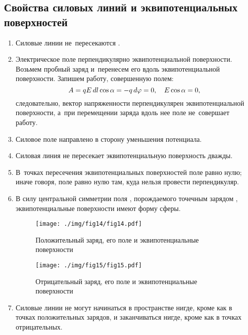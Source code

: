 	\subsection{Свойства силовых линий и эквипотенциальных поверхностей}
		\begin{enumerate}
			\item Силовые линии не~пересекаются .
			\item Электрическое поле  перпендикулярно эквипотенциальной поверхности. Возьмем пробный заряд  и~перенесем его вдоль эквипотенциальной поверхности. Запишем работу, совершенную полем:
				$$A=qE\,d l\cos{\alpha}=-q\,d \varphi = 0, \quad E\cos{\alpha}=0,$$
				следовательно, вектор напряженности  перпендикулярен эквипотенциальной поверхности, а~при перемещении заряда вдоль нее поле не~совершает работу.
			\item Силовое поле направлено в сторону уменьшения потенциала.
			\item Силовая линия  не пересекает эквипотенциальную поверхность дважды.
			\item В~точках пересечения эквипотенциальных поверхностей поле равно нулю; иначе говоря, поле равно нулю там, куда нельзя провести перпендикуляр.
			\item В силу центральной симметрии поля , порождаемого точечным зарядом , эквипотенциальные поверхности имеют форму сферы.
					\begin{figure}[h!]
						\centering
						\texttt{[image: ./img/fig14/fig14.pdf]}
						\caption{Положительный заряд, его поле и эквипотенциальные поверхности}
					\end{figure}
					\begin{figure}[h!]
						\centering
						\texttt{[image: ./img/fig15/fig15.pdf]}
						\caption{Отрицательный заряд, его поле и эквипотенциальные поверхности}
					\end{figure}

			\item Силовые линии  не могут начинаться в пространстве нигде, кроме как в точках положительных зарядов, и заканчиваться нигде, кроме как в точках отрицательных.
		\end{enumerate}

